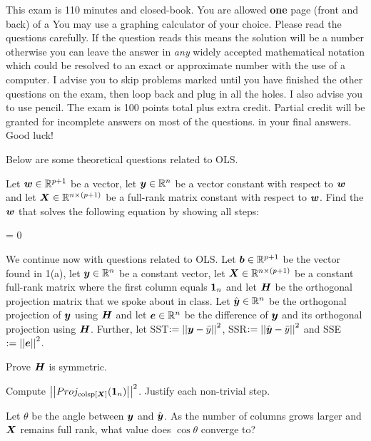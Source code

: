\documentclass[12pt]{article}
\begin{document}
This exam is 110 minutes and closed-book. You are allowed \textbf{one} page (front and back) of a  You may use a graphing calculator of your choice. Please read the questions carefully. If the question reads  this means the solution will be a number otherwise you can leave the answer in \textit{any} widely accepted mathematical notation which could be resolved to an exact or approximate number with the use of a computer. I advise you to skip problems marked  until you have finished the other questions on the exam, then loop back and plug in all the holes. I also advise you to use pencil. The exam is 100 points total plus extra credit. Partial credit will be granted for incomplete answers on most of the questions.  in your final answers. Good luck!

\pagebreak

\problem Below are some theoretical questions related to OLS.

\benum
{} Let $\boldsymbol{w} \in \mathbb{R}^{p+1}$ be a vector, let $\boldsymbol{y} \in \mathbb{R}^n$ be a vector constant with respect to $\boldsymbol{w}$ and let $\boldsymbol{X} \in \mathbb{R}^{n \times (p + 1)}$ be a full-rank matrix constant with respect to $\boldsymbol{w}$. Find the $\boldsymbol{w}$ that solves the following equation by showing all steps:

\beqn
\partialop{\w}{\y^\top \y - 2\w \X^\top \y + \w^\top \X^\top \X \w} = 0
\eeqn{}
\eenum

\problem We continue now with questions related to OLS. Let $\boldsymbol{b} \in \mathbb{R}^{p+1}$ be the vector found in 1(a), let $\boldsymbol{y} \in \mathbb{R}^n$ be a constant vector, let $\boldsymbol{X} \in \mathbb{R}^{n \times (p + 1)}$ be a constant full-rank matrix where the first column equals $\boldsymbol{1}_n$ and let $\boldsymbol{H}$ be the orthogonal projection matrix that we spoke about in class. Let $\hat{\boldsymbol{y}} \in \mathbb{R}^n$ be the orthogonal projection of $\boldsymbol{y}$ using $\boldsymbol{H}$ and let $\boldsymbol{e} \in \mathbb{R}^n$ be the difference of $\boldsymbol{y}$ and its orthogonal projection using $\boldsymbol{H}$. Further, let SST$ := \left|\left|\boldsymbol{y} - \bar{y}\right|\right|^2$, SSR$ := \left|\left|\hat{\boldsymbol{y}} - \bar{y}\right|\right|^2$ and SSE$ := \left|\left|\boldsymbol{e}\right|\right|^2$.

\benum

 Prove $\boldsymbol{H}$ is symmetric. 

 Compute $\left|\left|Proj_{\text{colsp}\left[\boldsymbol{X}\right]}(\boldsymbol{1}_n)\right|\right|^2$. Justify each non-trivial step. 

 Let $\theta$ be the angle between $\boldsymbol{y}$ and $\hat{\boldsymbol{y}}$. As the number of columns grows larger and $\boldsymbol{X}$ remains full rank, what value does $\cos{\theta}$ converge to? 
\end{document}
